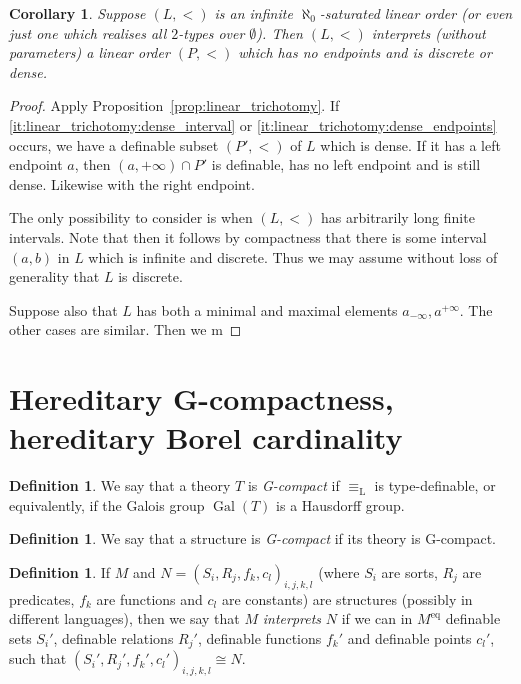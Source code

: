 \documentclass[final,a4paper,12pt]{amsart}
\newcommand\Lasc{{\mathrm{L}}}
\newcommand{\eq}{\mathrm{eq}}
\DeclareMathOperator{\Gal}{{Gal}}
\newtheorem{cor}[thm]{Corollary}
\theoremstyle{remark}
\theoremstyle{definition}
\newtheorem{dfn}[thm]{Definition}
\begin{document}
	\begin{cor}
		Suppose $(L,<)$ is an infinite $\aleph_0$-saturated linear order (or even just one which realises all $2$-types over $\emptyset$). Then $(L,<)$ interprets (without parameters) a linear order $(P,<)$ which has no endpoints and is discrete or dense.
	\end{cor}
	\begin{proof}
		Apply Proposition~\ref{prop:linear_trichotomy}. If \ref{it:linear_trichotomy:dense_interval} or \ref{it:linear_trichotomy:dense_endpoints} occurs, we have a definable subset $(P',<)$ of $L$ which is dense. If it has a left endpoint $a$, then $(a,+\infty)\cap P'$ is definable, has no left endpoint and is still dense. Likewise with the right endpoint.
		
		The only possibility to consider is when $(L,<)$ has arbitrarily long finite intervals. Note that then it follows by compactness that there is some interval $(a,b)$ in $L$ which is infinite and discrete. Thus we may assume without loss of generality that $L$ is discrete.
		
		Suppose also that $L$ has both a minimal and maximal elements $a_{-\infty}, a^{+\infty}$. The other cases are similar. Then we m
	\end{proof}
	
	\section{Hereditary G-compactness, hereditary Borel cardinality}
	
	\begin{dfn}
		We say that a theory $T$ is \emph{G-compact} if $\equiv_\Lasc$ is type-definable, or equivalently, if the Galois group $\Gal(T)$ is a Hausdorff group.
	\end{dfn}
	
	\begin{dfn}
		We say that a structure is \emph{G-compact} if its theory is G-compact.
	\end{dfn}
	
	\begin{dfn}
		If $M$ and $N=(S_i,R_j,f_k,c_l)_{i,j,k,l}$ (where $S_i$ are sorts, $R_j$ are predicates, $f_k$ are functions and $c_l$ are constants) are structures (possibly in different languages), then we say that $M$ \emph{interprets} $N$ if we can in $M^{\eq}$ definable sets $S_i'$, definable relations $R_j'$, definable functions $f_k'$ and definable points $c_l'$, such that $(S_i',R_j',f_k',c_l')_{i,j,k,l}\cong N$.
	\end{dfn}
	
\end{document}
